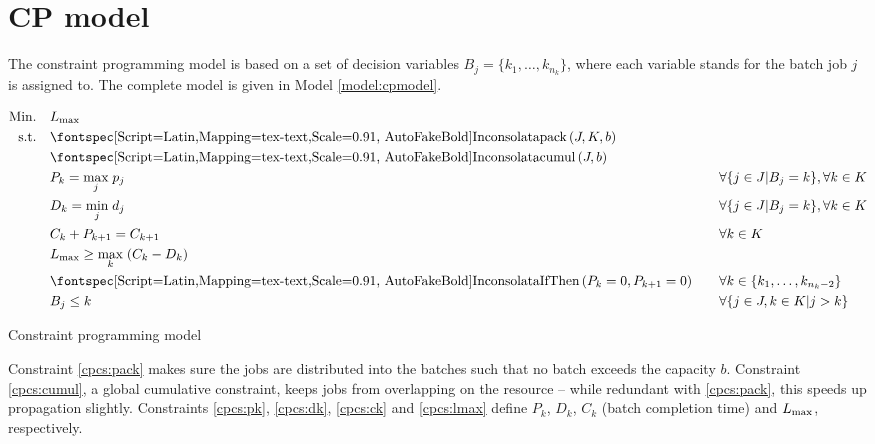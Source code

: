 \section{CP model}
The constraint programming model is based on a set of decision variables $B_j =
\{k_1, \dots, k_{n_k} \}$, where each variable stands for the batch job $j$ is
assigned to. The complete model is given in Model \ref{model:cpmodel}.

\begin{model}

\begin{alignat}{2}
\mathrm{Min.}\quad & \Lmax && \\
\mathrm{s.t.}\quad & \label{cpcs:pack} \mathtt{pack}(J, K, b) && \\
& \label{cpcs:cumul} \mathtt{cumul}(J, b) && \\
& \label{cpcs:pk} P_k = \underset{j}{\max} \; p_j \quad && \forall \{j \in J
| B_j = k\}, \forall k \in K \\
& \label{cpcs:dk} D_k = \underset{j}{\min} \; d_j \quad && \forall \{j \in J
| B_j = k\}, \forall k \in K \\
& \label{cpcs:ck} C_k + P_{k+1} = C_{k+1} \quad && \forall k \in K \\
& \label{cpcs:lmax} \Lmax \geq \underset{k}{\max} \; (C_k - D_k) && \\
& \label{cpcs:empty} \mathtt{IfThen}(P_k = 0, P_{k+1} = 0) \quad && \forall k
\in \{ k_1, \dots, k_{n_k - 2}\} \\
& \label{cpcs:pp} B_j \leq k \quad && \forall \{ j \in J, k \in K | j > k \}
\end{alignat}
\caption{Constraint programming model}
\label{model:cpmodel}
\end{model}

Constraint \eqref{cpcs:pack} makes sure the jobs are distributed into the
batches such that no batch exceeds the capacity $b$. Constraint
\eqref{cpcs:cumul}, a global cumulative constraint, keeps jobs from overlapping
on the resource -- while redundant with \eqref{cpcs:pack}, this speeds up
propagation slightly. Constraints \eqref{cpcs:pk}, \eqref{cpcs:dk},
\eqref{cpcs:ck} and \eqref{cpcs:lmax} define $P_k$, $D_k$, $C_k$ (batch
completion time) and $L_{\text{max}}$, respectively.

